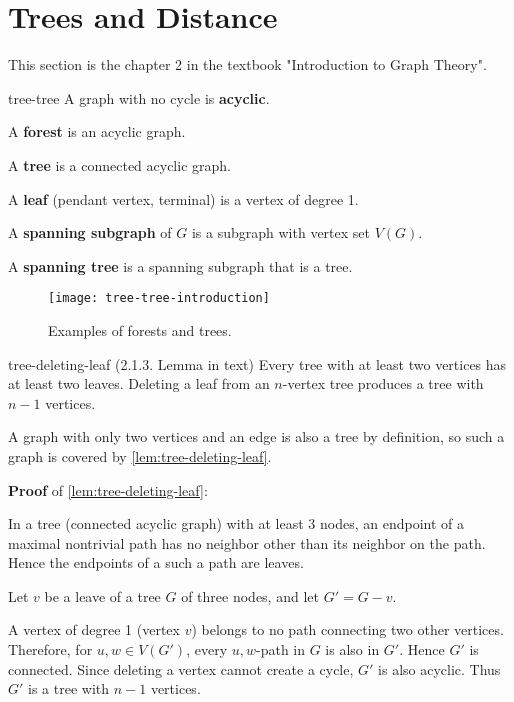 \documentclass[../src/handouts/main.tex]{subfiles}
\begin{document}
\section{Trees and Distance}

This section is the chapter 2 in the textbook "Introduction to Graph Theory".


\begin{definition}{}{tree-tree}
  A graph with no cycle is \textbf{acyclic}.

  A \textbf{forest} is an acyclic graph.

  A \textbf{tree} is a connected acyclic graph.

  A \textbf{leaf} (pendant vertex, terminal) is a vertex of degree 1.

  A \textbf{spanning subgraph} of $G$ is a subgraph with vertex set $V(G)$.

  A \textbf{spanning tree} is a spanning subgraph that is a tree.
\end{definition}

\begin{figure}[htbp]
  \centering
  \texttt{[image: tree-tree-introduction]}
  \caption{Examples of forests and trees.}
\end{figure}

\begin{lemma}{}{tree-deleting-leaf}
  (2.1.3. Lemma in text)
  Every tree with at least two vertices has at least two leaves.
  Deleting a leaf from an $n$-vertex tree produces a tree with $n-1$ vertices.
\end{lemma}

A graph with only two vertices and an edge is also a tree by definition, so such a graph is covered by \cref{lem:tree-deleting-leaf}.

\textbf{Proof} of \cref{lem:tree-deleting-leaf}:
\begin{enumerate*}
  \item {}
  \item In a tree (connected acyclic graph) with at least 3 nodes, an endpoint of a maximal nontrivial path has no neighbor other than its neighbor on the path. Hence the endpoints of a such a path are leaves.
  \item Let $v$ be a leave of a tree $G$ of three nodes, and let $G' = G - v$.
  \item A vertex of degree 1 (vertex $v$) belongs to no path connecting two other vertices. Therefore, for $u, w \in V\left( G' \right)$, every $u,w$-path in $G$ is also in $G'$. Hence $G'$ is connected. Since deleting a vertex cannot create a cycle, $G'$ is also acyclic. Thus $G'$ is a tree with $n - 1$ vertices.
\end{enumerate*}
\end{document}
